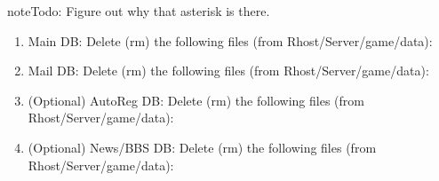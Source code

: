 \documentclass[letterpaper,10pt,english]{sphinxmanual}
\begin{document}
\begin{sphinxadmonition}{note}{\label{\detokenize{legacy:id1}}Todo:}
\sphinxAtStartPar
Figure out why that asterisk is there.
\end{sphinxadmonition}
\begin{enumerate}
%
\item {} 
\sphinxAtStartPar
Main DB: Delete (rm) the following files (from Rhost/Server/game/data):

\begin{sphinxVerbatim}[commandchars=\\\{\}]
\end{sphinxVerbatim}

\item {} 
\sphinxAtStartPar
Mail DB: Delete (rm) the following files (from Rhost/Server/game/data):

\begin{sphinxVerbatim}[commandchars=\\\{\}]
\end{sphinxVerbatim}

\item {} 
\sphinxAtStartPar
(Optional) AutoReg DB: Delete (rm) the following files (from Rhost/Server/game/data):

\begin{sphinxVerbatim}[commandchars=\\\{\}]
\end{sphinxVerbatim}

\item {} 
\sphinxAtStartPar
(Optional) News/BBS DB: Delete (rm) the following files (from Rhost/Server/game/data):

\begin{sphinxVerbatim}[commandchars=\\\{\}]
\end{sphinxVerbatim}

\end{enumerate}
\end{document}
